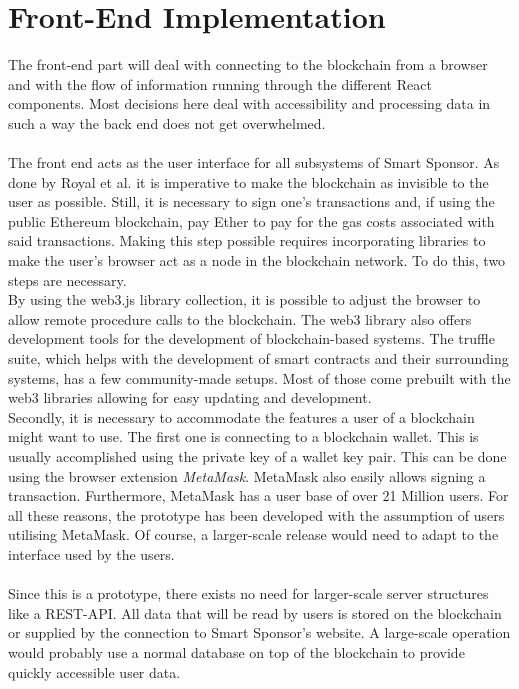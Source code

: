 \section{Front-End Implementation}
The front-end part will deal with connecting to the blockchain from a browser and with the flow of information running through the different React components. Most decisions here deal with accessibility and processing data in such a way the back end does not get overwhelmed.\\
\\
The front end acts as the user interface for all subsystems of Smart Sponsor. As done by Royal et al.\cite{royal} it is imperative to make the blockchain as invisible to the user as possible. Still, it is necessary to sign one's transactions and, if using the public Ethereum blockchain, pay Ether to pay for the gas costs associated with said transactions. Making this step possible requires incorporating libraries to make the user's browser act as a node in the blockchain network. To do this, two steps are necessary.\\
By using the web3.js library\cite{web3} collection, it is possible to adjust the browser to allow remote procedure calls to the blockchain. The web3 library also offers development tools for the development of blockchain-based systems. The truffle suite, which helps with the development of smart contracts and their surrounding systems, has a few community-made setups. Most of those come prebuilt with the web3 libraries allowing for easy updating and development.\\
Secondly, it is necessary to accommodate the features a user of a blockchain might want to use. The first one is connecting to a blockchain wallet. This is usually accomplished using the private key of a wallet key pair. This can be done using the browser extension \emph{MetaMask}\cite{meta}. MetaMask also easily allows signing a transaction. Furthermore, MetaMask has a user base of over 21 Million users\cite{metastat}. For all these reasons, the prototype has been developed with the assumption of users utilising MetaMask. Of course, a larger-scale release would need to adapt to the interface used by the users.\\
\\
Since this is a prototype, there exists no need for larger-scale server structures like a REST-API. All data that will be read by users is stored on the blockchain or supplied by the connection to Smart Sponsor's website. A large-scale operation would probably use a normal database on top of the blockchain to provide quickly accessible user data.\\
